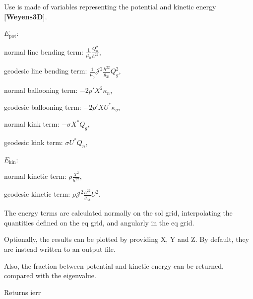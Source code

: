 Use is made of variables representing the potential and kinetic energy {\bfseries [Weyens3D]}.
\begin{DoxyItemize}
\item $E_\text{pot}$\+:
\begin{DoxyItemize}
\item normal line bending term\+: $\frac{1}{\mu_0} \frac{Q_n^2}{h^{22}}$,
\item geodesic line bending term\+: $\frac{1}{\mu_0} \mathcal{J}^2 \frac{h^{22}}{g_{33}} Q_g^2$,
\item normal ballooning term\+: $-2 p' X^2 \kappa_n$,
\item geodesic ballooning term\+: $-2 p' X U^* \kappa_g$,
\item normal kink term\+: $-\sigma X^*Q_g$,
\item geodesic kink term\+: $\sigma U^*Q_n$,
\end{DoxyItemize}
\item $E_\text{kin}$\+:
\begin{DoxyItemize}
\item normal kinetic term\+: $\rho \frac{X^2}{h^{22}}$,
\item geodesic kinetic term\+: $\rho \mathcal{J}^2 \frac{h^{22}}{g_{33}} U^2$.
\end{DoxyItemize}
\end{DoxyItemize}

The energy terms are calculated normally on the sol grid, interpolating the quantities defined on the eq grid, and angularly in the eq grid.

Optionally, the results can be plotted by providing X, Y and Z. By default, they are instead written to an output file.

Also, the fraction between potential and kinetic energy can be returned, compared with the eigenvalue.

\begin{DoxyReturn}{Returns}
ierr
\end{DoxyReturn}

